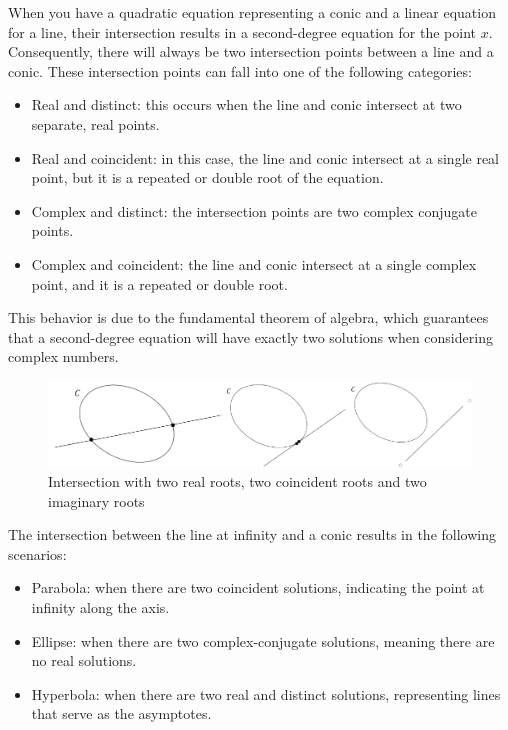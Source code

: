 \documentclass[12pt, a4paper]{report}
\begin{document}
    When you have a quadratic equation representing a conic and a linear equation for a line, their intersection results in a second-degree equation for the point $x$. 
    Consequently, there will always be two intersection points between a line and a conic. 
    These intersection points can fall into one of the following categories:
    \begin{itemize}
        \item Real and distinct: this occurs when the line and conic intersect at two separate, real points.
        \item Real and coincident: in this case, the line and conic intersect at a single real point, but it is a repeated or double root of the equation.
        \item Complex and distinct: the intersection points are two complex conjugate points.
        \item Complex and coincident: the line and conic intersect at a single complex point, and it is a repeated or double root.
    \end{itemize}
    This behavior is due to the fundamental theorem of algebra, which guarantees that a second-degree equation will have exactly two solutions when considering complex numbers.
    \begin{figure}[H]
        \centering
        \includegraphics[width=0.75\linewidth]{images/intersection.png}
        \caption{Intersection with two real roots, two coincident roots and two imaginary roots}
    \end{figure}
    The intersection between the line at infinity and a conic results in the following scenarios:
    \begin{itemize}
        \item Parabola: when there are two coincident solutions, indicating the point at infinity along the axis.
        \item Ellipse: when there are two complex-conjugate solutions, meaning there are no real solutions.
        \item Hyperbola: when there are two real and distinct solutions, representing lines that serve as the asymptotes.
    \end{itemize}
\end{document}
